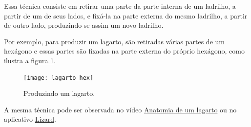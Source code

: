 Essa técnica consiste em retirar uma parte da parte interna de um ladrilho, a partir de um de seus lados, e fixá-la na parte externa do mesmo ladrilho, a partir de outro lado, produzindo-se assim um novo ladrilho.

Por exemplo, para produzir um lagarto, são retiradas várias partes de um hexágono e essas partes são fixadas na parte externa do próprio hexágono, como ilustra a \hyperref[lagarto_hex]{figura \ref{lagarto_hex}}.


 \begin{figure}[H]
	\centering
	\texttt{[image: lagarto\_hex]}
	\caption{Produzindo um lagarto.}
	\label{lagarto_hex}
\end{figure}

A mesma técnica pode ser observada no vídeo \href{ https://youtu.be/T6L6bE_bTMo}{Anatomia de um lagarto} ou no  aplicativo \href{https://www.geogebra.org/m/zs2ud4w5} {Lizard}.


\needspace{.2\textheight}


